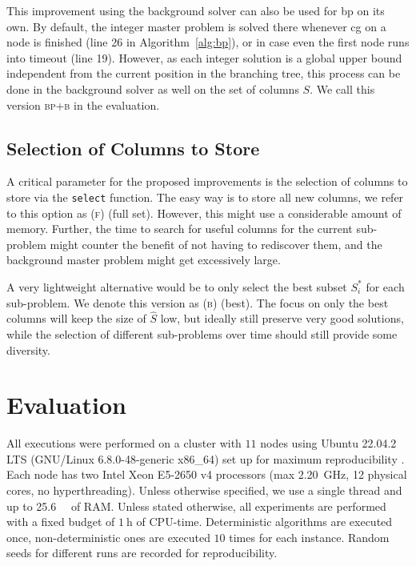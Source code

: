 \documentclass[]{amsart}
\newcommand{\bpbg}{\textsc{bp+b}\xspace}
\theoremstyle{plain}
\begin{document}
This improvement using the background solver can also be used for \acrlong{bp} on its own. By default, the integer master problem is solved there whenever \acrlong{cg} on a node is finished (line 26 in Algorithm~\ref{alg:bp}), or in case even the first node runs into timeout (line 19). However, as each integer solution is a global upper bound independent from the current position in the branching tree, this process can be done in the background solver as well on the set of columns $S$. We call this version \bpbg in the evaluation.

\subsection{Selection of Columns to Store}
\label{sec:col_select}

A critical parameter for the proposed improvements is the selection of columns to store via the \texttt{select} function. The easy way is to store all new columns, we refer to this option as \textsc{(f)} (full set). However, this might use a considerable amount of memory. Further, the time to search for useful columns for the current sub-problem might counter the benefit of not having to rediscover them, and the background master problem might get excessively large.

A very lightweight alternative would be to only select the best subset $S_i^*$ for each sub-problem. We denote this version as \textsc{(b)} (best). The focus on only the best columns will keep the size of $\hat{S}$ low, but ideally still preserve very good solutions, while the selection of different sub-problems over time should still provide some diversity.

\afterpage{\clearpage}
\section{Evaluation}
\label{sec:results}


All executions were performed on a cluster with $11$ nodes using Ubuntu 22.04.2 LTS (GNU/Linux 6.8.0-48-generic x86\_64) set up for maximum reproducibility \cite{fichte2024parallel}.
Each node has two  Intel
Xeon E5-2650 v4 processors (max \qty{2.20}{\giga\hertz}, 12 physical cores, no hyperthreading). Unless otherwise specified, we use a single thread and up to  \qty{25.6}{\giga\byte} of RAM. Unless stated otherwise, 
all experiments are performed with a fixed budget of $\qty{1}{\hour}$ of CPU-time. Deterministic algorithms are executed once, non-deterministic ones are executed $10$ times for each instance. Random seeds for different runs are recorded for reproducibility.
\end{document}
